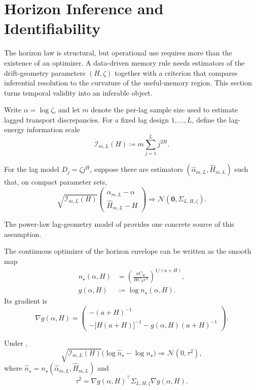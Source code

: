 \section{Horizon Inference and Identifiability}
\label{sec:inferable_horizons}

The horizon law is structural, but operational use requires more than the
existence of an optimizer. A data-driven memory rule needs estimators of the
drift-geometry parameters $(H,\zeta)$ together with a criterion that compares
inferential resolution to the curvature of the useful-memory region. This
section turns temporal validity into an inferable object.

Write $\alpha = \log \zeta$, and let $m$ denote the per-lag sample size used to
estimate lagged transport discrepancies. For a fixed lag design
$1,\dots,L$, define the lag-energy information scale
\[
  \mathcal I_{m,L}(H) \coloneqq m\sum_{j=1}^L j^{2H}.
\]

\begin{assumption}
\label{ass:lag_geometry_input}
For the lag model $D_j = \zeta j^H$, suppose there are estimators
$(\widehat \alpha_{m,L},\widehat H_{m,L})$ such that, on compact parameter sets,
\[
  \sqrt{\mathcal I_{m,L}(H)}
  \begin{pmatrix}
    \widehat \alpha_{m,L} - \alpha \\
    \widehat H_{m,L} - H
  \end{pmatrix}
  \Rightarrow \mathcal N(\mathbf 0, \Sigma_{L,H,\zeta}).
\]
\end{assumption}

The power-law lag-geometry model of \citet{Parreira2026Jul} provides one
concrete source of this assumption.

The continuous optimizer of the horizon envelope can be written as the smooth
map
\[
  \begin{aligned}
    n_\star(\alpha,H)
    &= \left(\frac{aC_K}{H C_S e^{\alpha}}\right)^{1/(a+H)}, \\
    g(\alpha,H) &\coloneqq \log n_\star(\alpha,H).
  \end{aligned}
\]
Its gradient is
\[
  \nabla g(\alpha,H)
  =
  \begin{pmatrix}
    -(a+H)^{-1} \\
    -\bigl[H(a+H)\bigr]^{-1} - g(\alpha,H)(a+H)^{-1}
  \end{pmatrix}.
\]

\begin{theorem}
\label{thm:plugin_horizon_clt}
Under ,
\[
  \sqrt{\mathcal I_{m,L}(H)}
  \bigl(\log \widehat n_\star - \log n_\star\bigr)
  \Rightarrow \mathcal N(0,\tau^2),
\]
where $\widehat n_\star = n_\star(\widehat \alpha_{m,L},\widehat H_{m,L})$ and
\[
  \tau^2
  = \nabla g(\alpha,H)^\top \Sigma_{L,H,\zeta} \nabla g(\alpha,H).
\]
\end{theorem}

